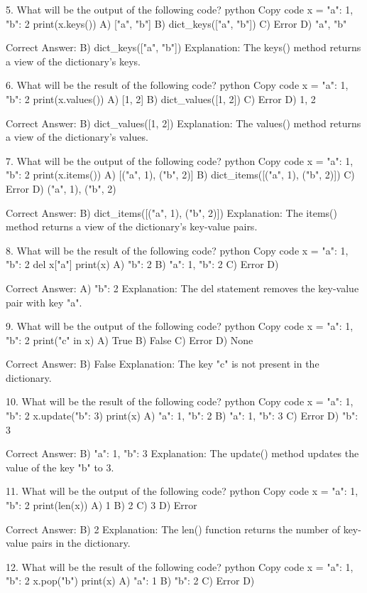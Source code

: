 5. What will be the output of the following code?
python
Copy code
x = {"a": 1, "b": 2}
print(x.keys())
A) ["a", "b"]
B) dict_keys(["a", "b"])
C) Error
D) {"a", "b"}

Correct Answer: B) dict_keys(["a", "b"])
Explanation: The keys() method returns a view of the dictionary's keys.

6. What will be the result of the following code?
python
Copy code
x = {"a": 1, "b": 2}
print(x.values())
A) [1, 2]
B) dict_values([1, 2])
C) Error
D) {1, 2}

Correct Answer: B) dict_values([1, 2])
Explanation: The values() method returns a view of the dictionary's values.

7. What will be the output of the following code?
python
Copy code
x = {"a": 1, "b": 2}
print(x.items())
A) [("a", 1), ("b", 2)]
B) dict_items([("a", 1), ("b", 2)])
C) Error
D) {("a", 1), ("b", 2)}

Correct Answer: B) dict_items([("a", 1), ("b", 2)])
Explanation: The items() method returns a view of the dictionary's key-value pairs.

8. What will be the result of the following code?
python
Copy code
x = {"a": 1, "b": 2}
del x["a"]
print(x)
A) {"b": 2}
B) {"a": 1, "b": 2}
C) Error
D) {}

Correct Answer: A) {"b": 2}
Explanation: The del statement removes the key-value pair with key "a".

9. What will be the output of the following code?
python
Copy code
x = {"a": 1, "b": 2}
print("c" in x)
A) True
B) False
C) Error
D) None

Correct Answer: B) False
Explanation: The key "c" is not present in the dictionary.

10. What will be the result of the following code?
python
Copy code
x = {"a": 1, "b": 2}
x.update({"b": 3})
print(x)
A) {"a": 1, "b": 2}
B) {"a": 1, "b": 3}
C) Error
D) {"b": 3}

Correct Answer: B) {"a": 1, "b": 3}
Explanation: The update() method updates the value of the key "b" to 3.

11. What will be the output of the following code?
python
Copy code
x = {"a": 1, "b": 2}
print(len(x))
A) 1
B) 2
C) 3
D) Error

Correct Answer: B) 2
Explanation: The len() function returns the number of key-value pairs in the dictionary.

12. What will be the result of the following code?
python
Copy code
x = {"a": 1, "b": 2}
x.pop("b")
print(x)
A) {"a": 1}
B) {"b": 2}
C) Error
D) {}

